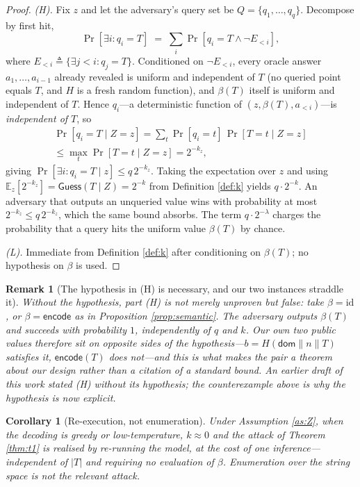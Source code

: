 \documentclass[journal]{IEEEtran}
\newtheorem{corollary}[theorem]{Corollary}
\newtheorem{remark}[theorem]{Remark}
\begin{document}
\begin{proof}
\emph{(H).} Fix $z$ and let the adversary's query set be
$Q = \{q_1, \dots, q_q\}$. Decompose by first hit,
\[
\Pr[\exists i : q_i = T] \;=\; \sum_i \Pr\!\left[q_i = T \wedge \neg E_{<i}\right],
\]
where $E_{<i} \triangleq \{\exists j < i : q_j = T\}$.
Conditioned on $\neg E_{<i}$, every oracle answer $a_1,\dots,a_{i-1}$ already
revealed is uniform and independent of $T$ (no queried point equals $T$, and $H$
is a fresh random function), and $\beta(T)$ itself is uniform and independent of
$T$. Hence $q_i$---a deterministic function of $(z, \beta(T), a_{<i})$---is
\emph{independent of $T$}, so
\begin{multline*}
\Pr[q_i = T \mid Z = z]
= \sum_t \Pr[q_i = t]\,\Pr[T = t \mid Z = z] \\
\le \max_t \Pr[T = t \mid Z = z] = 2^{-k_z},
\end{multline*}
giving $\Pr[\exists i : q_i = T \mid z] \le q\,2^{-k_z}$. Taking the expectation
over $z$ and using $\mathbb{E}_z[2^{-k_z}] = \mathsf{Guess}(T \mid Z) = 2^{-k}$
from Definition \ref{def:k} yields $q \cdot 2^{-k}$. An adversary that outputs
an unqueried value wins with probability at most $2^{-k_z} \le q\,2^{-k_z}$,
which the same bound absorbs. The term $q \cdot 2^{-\lambda}$ charges the
probability that a query hits the uniform value $\beta(T)$ by chance.

\emph{(L).} Immediate from Definition \ref{def:k} after conditioning on
$\beta(T)$; no hypothesis on $\beta$ is used.
\end{proof}

\begin{remark}[The hypothesis in (H) is necessary, and our two instances straddle it]
\label{rem:betanecessary}
Without the hypothesis, part (H) is not merely unproven but \emph{false}: take
$\beta = \mathrm{id}$, or $\beta = \mathsf{encode}$ as in
Proposition \ref{prop:semantic}. The adversary outputs $\beta(T)$ and succeeds
with probability $1$, independently of $q$ and $k$. Our own two public values
therefore sit on opposite sides of the hypothesis---$b =
H(\mathsf{dom}\|n\|T)$ satisfies it, $\mathsf{encode}(T)$ does not---and this is
what makes the pair a theorem about \emph{our design} rather than a citation of
a standard bound. An earlier draft of this work stated (H) without its
hypothesis; the counterexample above is why the hypothesis is now explicit.
\end{remark}

\begin{corollary}[Re-execution, not enumeration]
\label{cor:reexec}
Under Assumption \ref{as:Z}, when the decoding is greedy or low-temperature,
$k \approx 0$ and the attack of Theorem \ref{thm:t1} is realised by
\emph{re-running the model}, at the cost of one inference---independent of
$|T|$ and requiring \emph{no} evaluation of $\beta$. Enumeration over the string
space is \emph{not} the relevant attack.
\end{corollary}
\end{document}

